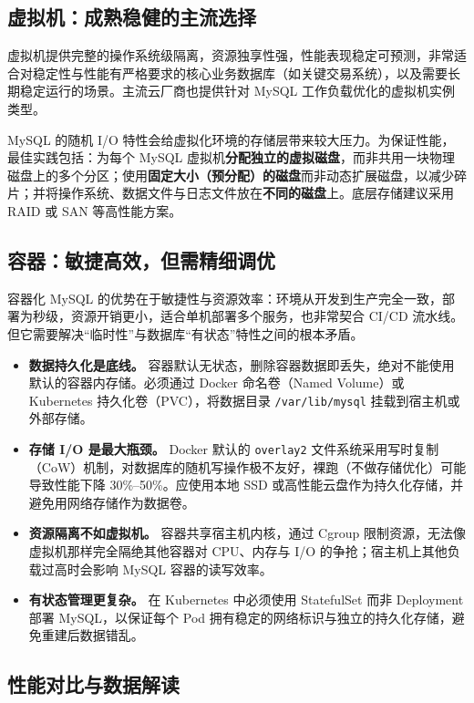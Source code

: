 \documentclass[12pt,UTF8]{ctexbook}
\begin{document}
\subsection{虚拟机：成熟稳健的主流选择}

虚拟机提供完整的操作系统级隔离，资源独享性强，性能表现稳定可预测，非常适合对稳定性与性能有严格要求的核心业务数据库（如关键交易系统），以及需要长期稳定运行的场景。主流云厂商也提供针对 MySQL 工作负载优化的虚拟机实例类型。

MySQL 的随机 I/O 特性会给虚拟化环境的存储层带来较大压力。为保证性能，最佳实践包括：为每个 MySQL 虚拟机\textbf{分配独立的虚拟磁盘}，而非共用一块物理磁盘上的多个分区；使用\textbf{固定大小（预分配）的磁盘}而非动态扩展磁盘，以减少碎片；并将操作系统、数据文件与日志文件放在\textbf{不同的磁盘}上。底层存储建议采用 RAID 或 SAN 等高性能方案。

\subsection{容器：敏捷高效，但需精细调优}

容器化 MySQL 的优势在于敏捷性与资源效率：环境从开发到生产完全一致，部署为秒级，资源开销更小，适合单机部署多个服务，也非常契合 CI/CD 流水线。但它需要解决“临时性”与数据库“有状态”特性之间的根本矛盾。

\begin{itemize}[leftmargin=2cm]
  \item \textbf{数据持久化是底线。} 容器默认无状态，删除容器数据即丢失，绝对不能使用默认的容器内存储。必须通过 Docker 命名卷（Named Volume）或 Kubernetes 持久化卷（PVC），将数据目录 \texttt{/var/lib/mysql} 挂载到宿主机或外部存储。
  \item \textbf{存储 I/O 是最大瓶颈。} Docker 默认的 \texttt{overlay2} 文件系统采用写时复制（CoW）机制，对数据库的随机写操作极不友好，裸跑（不做存储优化）可能导致性能下降 30\%--50\%。应使用本地 SSD 或高性能云盘作为持久化存储，并避免用网络存储作为数据卷。
  \item \textbf{资源隔离不如虚拟机。} 容器共享宿主机内核，通过 Cgroup 限制资源，无法像虚拟机那样完全隔绝其他容器对 CPU、内存与 I/O 的争抢；宿主机上其他负载过高时会影响 MySQL 容器的读写效率。
  \item \textbf{有状态管理更复杂。} 在 Kubernetes 中必须使用 StatefulSet 而非 Deployment 部署 MySQL，以保证每个 Pod 拥有稳定的网络标识与独立的持久化存储，避免重建后数据错乱。
\end{itemize}

\subsection{性能对比与数据解读}
\end{document}
